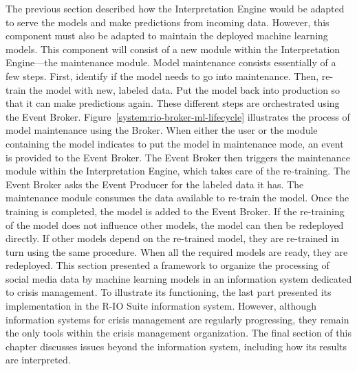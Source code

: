 The previous section described how the Interpretation Engine would be adapted to serve the models and make predictions from incoming data.
However, this component must also be adapted to maintain the deployed machine learning models.
This component will consist of a new module within the Interpretation Engine—the maintenance module.
Model maintenance consists essentially of a few steps.
First, identify if the model needs to go into maintenance.
Then, re-train the model with new, labeled data.
Put the model back into production so that it can make predictions again.
These different steps are orchestrated using the Event Broker.
Figure~\ref{system:rio-broker-ml-lifecycle} illustrates the process of model maintenance using the Broker.
When either the user or the module containing the model indicates to put the model in maintenance mode, an event is provided to the Event Broker.
The Event Broker then triggers the maintenance module within the Interpretation Engine, which takes care of the re-training.
The Event Broker asks the Event Producer for the labeled data it has.
The maintenance module consumes the data available to re-train the model.
Once the training is completed, the model is added to the Event Broker.
If the re-training of the model does not influence other models, the model can then be redeployed directly.
If other models depend on the re-trained model, they are re-trained in turn using the same procedure.
When all the required models are ready, they are redeployed.
This section presented a framework to organize the processing of social media data by machine learning models in an information system dedicated to crisis management.
To illustrate its functioning, the last part presented its implementation in the R-IO Suite information system.
However, although information systems for crisis management are regularly progressing, they remain the only tools within the crisis management organization.
The final section of this chapter discusses issues beyond the information system, including how its results are interpreted.

